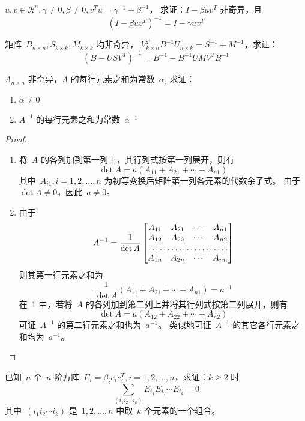 \documentclass[twoside,openright]{book}
\begin{document}
\begin{CJK*}{UTF8}{}
\begin{quest}
\label{quest:56}
$u,v\in\mathcal{R}^n,\gamma\neq0,\beta\neq0,v^Tu=\gamma^{-1}+\beta^{-1}$，
求证：$I-\beta uv^T$ 非奇异，且
\[
\left(I-\beta uv^T\right)^{-1}=I-\gamma uv^T
\]
\end{quest}

\begin{quest}
\label{quest:57}
矩阵\ $B_{n\times n},S_{k\times k},M_{k\times k}$ 均非奇异，
$V^T_{k\times n}B^{-1}U_{n\times k}=S^{-1}+M^{-1}$，求证：
\[
\left(
B-USV^T
\right)^{-1}=B^{-1}-B^{-1}UMV^TB^{-1}
\]
\end{quest}

\begin{quest}
\label{quest:58}
$A_{n \times n}$ 非奇异，$A$ 的每行元素之和为常数\ $\alpha$, 求证：
\begin{enumerate}
\item
$\alpha \neq 0$
\item
$A^{-1}$ 的每行元素之和为常数\ $\alpha^{-1}$
\end{enumerate}
\end{quest}
\begin{proof}
$ $

\begin{enumerate}
\item
将\ $A$ 的各列加到第一列上，其行列式按第一列展开，则有
\[
\det A=a(A_{11}+A_{21}+\dotsb+A_{n1})
\]
其中\ $A_{i1},i=1,2,\dotsc,n$ 为初等变换后矩阵第一列各元素的代数余子式。
由于\ $\det A \neq 0$，因此\ $a \neq 0$。
\item
由于
\[
A^{-1}=
\dfrac{1}{\det A}
\begin{bmatrix}
A_{11} & A_{21} & \cdots & A_{n1} \\
A_{12} & A_{22} & \cdots & A_{n2} \\
\hdotsfor{4}                      \\
A_{1n} & A_{2n} & \cdots & A_{nn}
\end{bmatrix}
\]
则其第一行元素之和为
\[
\dfrac{1}{\det A}(A_{11}+A_{21}+\dotsb+A_{n1})=a^{-1}
\]
在\ 1 中，若将\ $A$ 的各列加到第二列上并将其行列式按第二列展开，则有
\[
\det A=a(A_{12}+A_{22}+\dotsb+A_{n2})
\]
可证\ $A^{-1}$ 的第二行元素之和也为\ $a^{-1}$。
类似地可证\ $A^{-1}$ 的其它各行元素之和均为\ $a^{-1}$。
\end{enumerate}
\end{proof}

\begin{quest}
\label{quest:59}
已知\ $n$ 个\ $n$ 阶方阵\ $E_i=\beta_ie_ie_i^T,i=1,2,\dotsc,n$，求证：$k\geq2$ 时
\[
\sum_{(i_1i_2\dotsm i_k)}E_{i_1}E_{i_2}\dotsm E_{i_k}=0
\]
其中\ $(i_1i_2\dotsm i_k)$ 是\ $1,2,\dotsc,n$ 中取\ $k$ 个元素的一个组合。
\end{quest}


\end{CJK*}
\end{document}
